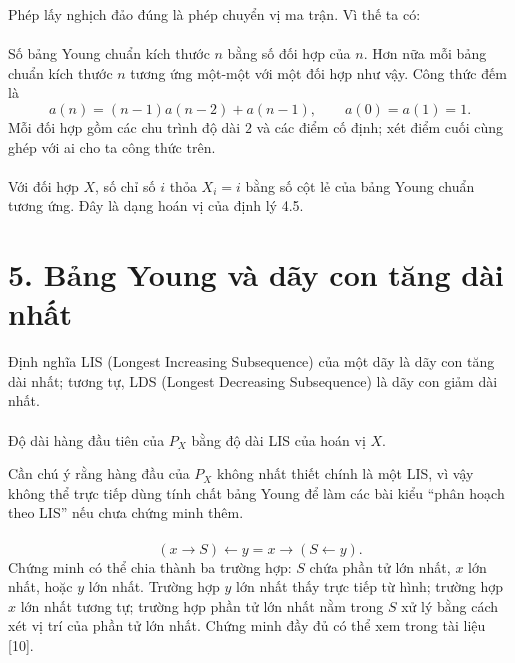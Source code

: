 \documentclass[11pt]{article}
\begin{document}
Phép lấy nghịch đảo đúng là phép chuyển vị ma trận. Vì thế ta có:

\paragraph{}
Số bảng Young chuẩn kích thước \(n\) bằng số đối hợp của \(n\). Hơn nữa mỗi
bảng chuẩn kích thước \(n\) tương ứng một-một với một đối hợp như vậy. Công
thức đếm là
\[
a(n)=(n-1)a(n-2)+a(n-1),\qquad a(0)=a(1)=1.
\]
Mỗi đối hợp gồm các chu trình độ dài \(2\) và các điểm cố định; xét điểm cuối
cùng ghép với ai cho ta công thức trên.

\paragraph{}
Với đối hợp \(X\), số chỉ số \(i\) thỏa \(X_i=i\) bằng số cột lẻ của bảng
Young chuẩn tương ứng. Đây là dạng hoán vị của định lý 4.5.

\section*{5. Bảng Young và dãy con tăng dài nhất}

Định nghĩa LIS (Longest Increasing Subsequence) của một dãy là dãy con tăng
dài nhất; tương tự, LDS (Longest Decreasing Subsequence) là dãy con giảm dài
nhất.

\paragraph{}
Độ dài hàng đầu tiên của \(P_X\) bằng độ dài LIS của hoán vị \(X\).

Cần chú ý rằng hàng đầu của \(P_X\) không nhất thiết chính là một LIS, vì vậy
không thể trực tiếp dùng tính chất bảng Young để làm các bài kiểu ``phân hoạch
theo LIS'' nếu chưa chứng minh thêm.

\paragraph{}
\[
(x\to S)\leftarrow y=x\to(S\leftarrow y).
\]
Chứng minh có thể chia thành ba trường hợp: \(S\) chứa phần tử lớn nhất,
\(x\) lớn nhất, hoặc \(y\) lớn nhất. Trường hợp \(y\) lớn nhất thấy trực tiếp
từ hình; trường hợp \(x\) lớn nhất tương tự; trường hợp phần tử lớn nhất nằm
trong \(S\) xử lý bằng cách xét vị trí của phần tử lớn nhất. Chứng minh đầy đủ
có thể xem trong tài liệu [10].
\end{document}
